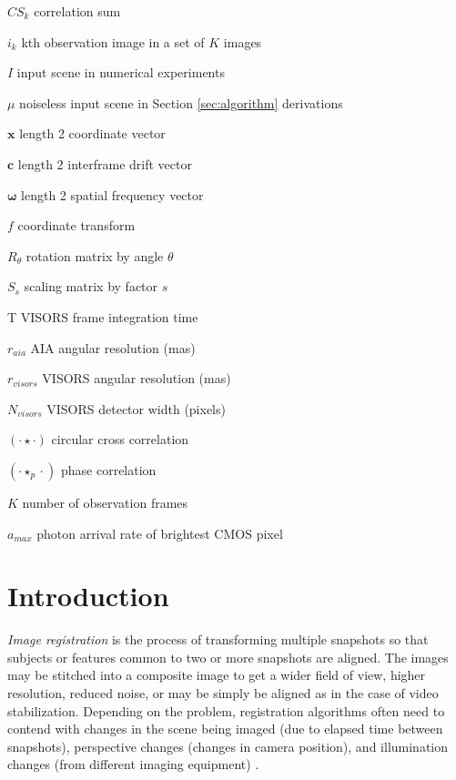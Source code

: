 \documentclass[tocnosub,noragright,centerchapter,12pt]{uiucecethesis09}
\begin{document}
\begin{symbollist*}
  \item[$CS_k$] correlation sum
  \item[$i_k$] kth observation image in a set of $K$ images
  \item[$I$] input scene in numerical experiments
  \item[$\mu$] noiseless input scene in Section \ref{sec:algorithm} derivations
  \item[$\bm{x}$] length 2 coordinate vector
  \item[$\bm{c}$] length 2 interframe drift vector
  \item[$\bm{\omega}$] length 2 spatial frequency vector
  \item[$f$] coordinate transform
  \item[$R_{\theta}$] rotation matrix by angle $\theta$
  \item[$S_s$] scaling matrix by factor $s$
  \item[T] VISORS frame integration time
  \item[$r_{aia}$] AIA angular resolution (mas)
  \item[$r_{visors}$] VISORS angular resolution (mas)
  \item[$N_{visors}$] VISORS detector width (pixels)
  \item[$(\cdot \star \cdot)$] circular cross correlation
  \item[$(\cdot \star_p \cdot)$] phase correlation
  \item[$K$] number of observation frames
  \item[$a_{max}$] photon arrival rate of brightest CMOS pixel
\end{symbollist*}

\mainmatter

\chapter{Introduction} \label{chap:introduction}

\emph{Image registration} is the process of transforming multiple snapshots so that subjects or features common to two or more snapshots are aligned.
The images may be stitched into a composite image to get a wider field of view, higher resolution, reduced noise, or may be simply be aligned as in the case of video stabilization.  Depending on the problem, registration algorithms often need to contend with changes in the scene being imaged (due to elapsed time between snapshots), perspective changes (changes in camera position), and illumination changes (from different imaging equipment) \cite{brown}.
\end{document}
